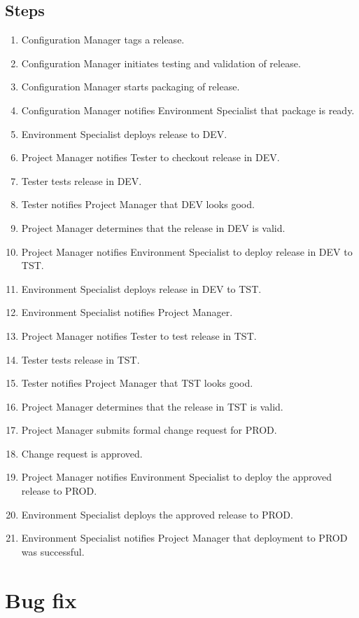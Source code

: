 \documentclass[12pt,notitlepage]{article}
\begin{document}
\subsection{Steps}
\begin{enumerate}
  \item Configuration Manager tags a release.
  \item Configuration Manager initiates testing and validation of release.
  \item Configuration Manager starts packaging of release.
  \item Configuration Manager notifies Environment Specialist that package is ready.
  \item Environment Specialist deploys release to DEV.
  \item Project Manager notifies Tester to checkout release in DEV.
  \item Tester tests release in DEV.
  \item Tester notifies Project Manager that DEV looks good.
  \item Project Manager determines that the release in DEV is valid.
  \item Project Manager notifies Environment Specialist to deploy release in DEV to TST.
  \item Environment Specialist deploys release in DEV to TST.
  \item Environment Specialist notifies Project Manager.
  \item Project Manager notifies Tester to test release in TST.
  \item Tester tests release in TST.
  \item Tester notifies Project Manager that TST looks good.
  \item Project Manager determines that the release in TST is valid.
  \item Project Manager submits formal change request for PROD.
  \item Change request is approved.
  \item Project Manager notifies Environment Specialist to deploy the approved release to PROD.
  \item Environment Specialist deploys the approved release to PROD.
  \item Environment Specialist notifies Project Manager that deployment to PROD was successful.
\end{enumerate}

\section{Bug fix}
\end{document}
